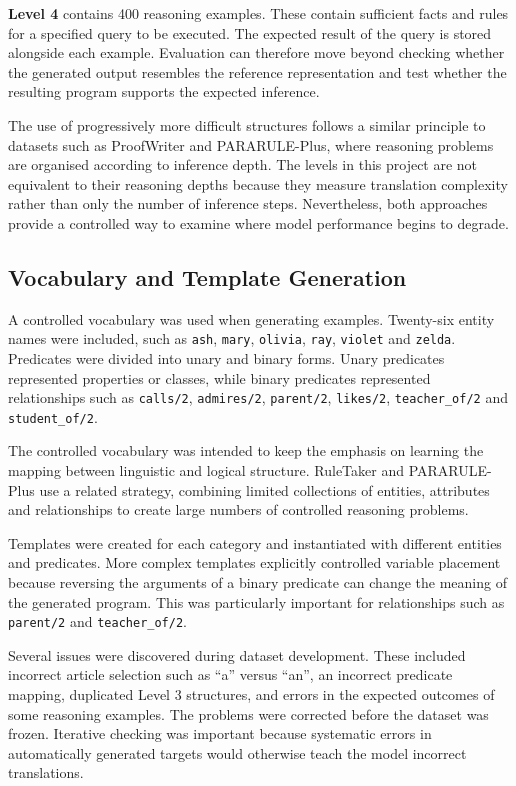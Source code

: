 \documentclass[11pt]{article} %
\theoremstyle{plain}
\theoremstyle{definition}
\begin{document}
\textbf{Level 4} contains 400 reasoning examples. These contain sufficient facts
and rules for a specified query to be executed. The expected result of the query
is stored alongside each example. Evaluation can therefore move beyond checking
whether the generated output resembles the reference representation and test
whether the resulting program supports the expected inference.

The use of progressively more difficult structures follows a similar principle
to datasets such as ProofWriter \cite{tafjord2021proofwriter} and PARARULE-Plus, where reasoning problems are
organised according to inference depth. The levels in this project are not
equivalent to their reasoning depths because they measure translation complexity
rather than only the number of inference steps. Nevertheless, both approaches
provide a controlled way to examine where model performance begins to degrade.

\subsection{Vocabulary and Template Generation}

A controlled vocabulary was used when generating examples. Twenty-six entity
names were included, such as \texttt{ash}, \texttt{mary}, \texttt{olivia},
\texttt{ray}, \texttt{violet} and \texttt{zelda}. Predicates were divided into
unary and binary forms. Unary predicates represented properties or classes,
while binary predicates represented relationships such as \texttt{calls/2},
\texttt{admires/2}, \texttt{parent/2}, \texttt{likes/2},
\texttt{teacher\_of/2} and \texttt{student\_of/2}.

The controlled vocabulary was intended to keep the emphasis on learning the
mapping between linguistic and logical structure. RuleTaker and PARARULE-Plus
use a related strategy, combining limited collections of entities, attributes
and relationships to create large numbers of controlled reasoning problems.

Templates were created for each category and instantiated with different
entities and predicates. More complex templates explicitly controlled variable
placement because reversing the arguments of a binary predicate can change the
meaning of the generated program. This was particularly important for
relationships such as \texttt{parent/2} and \texttt{teacher\_of/2}.

Several issues were discovered during dataset development. These included
incorrect article selection such as ``a'' versus ``an'', an incorrect predicate
mapping, duplicated Level 3 structures, and errors in the expected outcomes of
some reasoning examples. The problems were corrected before the dataset was
frozen. Iterative checking was important because systematic errors in
automatically generated targets would otherwise teach the model incorrect
translations.
\end{document}

